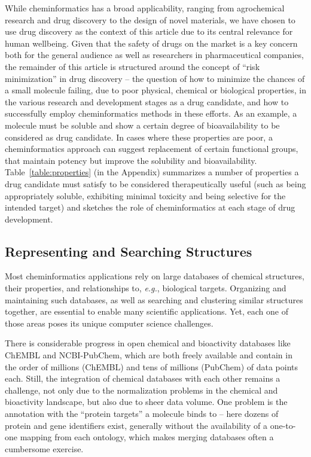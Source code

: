 \documentclass{sig-alternate}
\begin{document}
While cheminformatics has a broad applicability, ranging from
agrochemical research and drug discovery to the design of novel
materials, we have chosen to use drug discovery as the context of this
article due to its central relevance for human wellbeing. Given that
the safety of drugs on the market is a key concern both for the
general audience as well as researchers in pharmaceutical companies,
the remainder of this article is structured around the concept of
``risk minimization'' in drug discovery -- the question of how to
minimize the chances of a small molecule failing, due to poor
physical, chemical or biological properties, in the various research
and development stages as a drug candidate, and how to successfully
employ cheminformatics methods in these efforts. As an example, a
molecule must be soluble and show a certain degree of bioavailability
to be considered as drug candidate. In cases where these properties
are poor, a cheminformatics approach can suggest replacement of
certain functional groups, that maintain potency but improve the
solubility and bioavailability.  Table~\ref{table:properties} (in the
Appendix) summarizes a number of properties a drug candidate must
satisfy to be considered therapeutically useful (such as being
appropriately soluble, exhibiting minimal toxicity and being selective
for the intended target) and sketches the role of cheminformatics at
each stage of drug development.
%
\subsection{Representing and Searching Structures}
\label{sec:databases}
%
Most cheminformatics applications rely on large databases of chemical
structures, their properties, and relationships to, \textit{e.g.},
biological targets.  Organizing and maintaining such databases, as
well as searching and clustering similar structures together, are
essential to enable many scientific applications. Yet, each one of
those areas poses its unique computer science challenges.

There is considerable progress in open chemical and bioactivity
databases like ChEMBL and NCBI-PubChem, which are both freely
available and contain in the order of millions (ChEMBL) and tens of
millions (PubChem) of data points each. Still, the integration of
chemical databases with each other remains a challenge, not only due
to the normalization problems in the chemical and bioactivity
landscape, but also due to sheer data volume. One problem is the
annotation with the ``protein targets'' a molecule binds to -- here
dozens of protein and gene identifiers exist, generally without the
availability of a one-to-one mapping from each ontology, which makes
merging databases often a cumbersome exercise.
\end{document}
